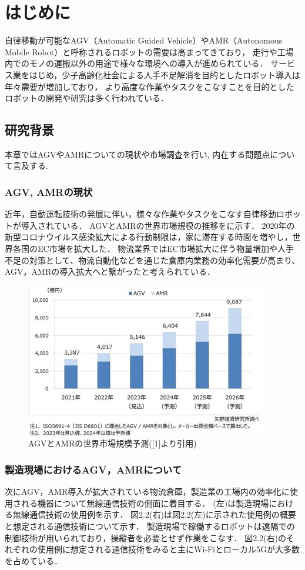\documentclass[main]{subfiles}
\begin{document}
\chapter{はじめに}
自律移動が可能なAGV（Automatic Guided Vehicle）やAMR（Autonomous Mobile Robot）と呼称されるロボットの需要は高まってきており，
走行や工場内でのモノの運搬以外の用途で様々な環境への導入が進められている．
サービス業をはじめ，少子高齢化社会による人手不足解消を目的としたロボット導入は年々需要が増加しており，
より高度な作業やタスクをこなすことを目的としたロボットの開発や研究は多く行われている．

\section{研究背景}
    本章ではAGVやAMRについての現状や市場調査を行い, 内在する問題点について言及する. 
    \subsection{AGV, AMRの現状}
    \vspace{9pt}
    近年，自動運転技術の発展に伴い，様々な作業やタスクをこなす自律移動ロボットが導入されている．
    AGVとAMRの世界市場規模の推移をに示す．
    2020年の新型コロナウイルス感染拡大による行動制限は，家に滞在する時間を増やし，世界各国のEC市場を拡大した．
    物流業界ではEC市場拡大に伴う物量増加や人手不足の対策として、物流自動化などを通じた倉庫内業務の効率化需要が高まり、
    AGV，AMRの導入拡大へと繋がったと考えられている．

    \begin{figure}[htbp]
        \centering
        \includegraphics[keepaspectratio, width=0.6\linewidth]{figures/first/1_1_image.png}
        \caption{AGVとAMRの世界市場規模予測([1]より引用)}
        \label{fig:label1-1}
    \end{figure}

    \subsection{製造現場におけるAGV，AMRについて}
    \vspace{9pt}
    次にAGV，AMR導入が拡大されている物流倉庫，製造業の工場内の効率化に使用される機器について無線通信技術の側面に着目する．
    (左)は製造現場における無線通信技術の使用例を示す．
    図2.2(右)は図2.2(左)に示された使用例の概要と想定される通信技術について示す．
    製造現場で稼働するロボットは遠隔での制御技術が用いられており，操縦者を必要とせず作業をこなす．
    図2.2(右)のそれぞれの使用例に想定される通信技術をみると主にWi-Fiとローカル5Gが大多数を占めている．
\end{document}
